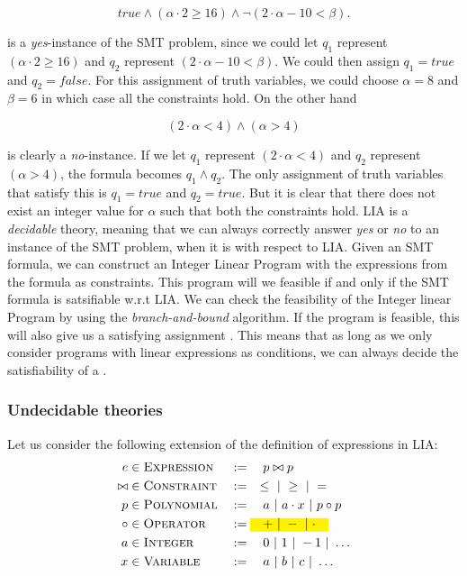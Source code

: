 	\begin{equation*}	
	true \land (\alpha \cdot 2 \geq 16) \land \neg (2\cdot \alpha - 10 < \beta).
	\end{equation*}

	is a \emph{yes}-instance of the SMT problem, since we could let $q_1$ represent $(\alpha \cdot 2 \geq 16)$ and $q_2$ represent $(2\cdot \alpha - 10 < \beta)$. We could then assign $q_1 = true$ and $q_2 = false$. For this assignment of truth variables, we could choose $\alpha = 8$ and $\beta = 6$ in which case all the constraints hold. On the other hand 
	
	\begin{equation*}
		(2\cdot \alpha < 4) \land (\alpha > 4)
	\end{equation*}
	
	is clearly a \emph{no}-instance. If we let $q_1$ represent $(2\cdot \alpha < 4)$ and $q_2$ represent $(\alpha > 4)$, the formula becomes $q_1\land q_2$. The only assignment of truth variables that satisfy this is $q_1 = true$ and $q_2 = true$. But it is clear that there does not exist an integer value for $\alpha$ such that both the constraints hold. LIA is a \emph{decidable} theory, meaning that we can always correctly answer \emph{yes} or \emph{no} to an instance of the SMT problem, when it is with respect to LIA. Given an SMT formula, we can construct an Integer Linear Program with the expressions from the formula as constraints. This program will we feasible if and only if the SMT formula is satsifiable w.r.t LIA. We can check the feasibility of the Integer linear Program by using the \emph{branch-and-bound} algorithm. If the program is feasible, this will also give us a satisfying assignment \citep{Vanderbei01linearprogramming:}. This means that as long as we only consider programs with linear expressions as conditions, we can always decide the satisfiability of a \pc.
	
	\subsubsection{Undecidable theories}
	Let us consider the following extension of the definition of expressions in LIA:
	\begin{alignat*}{3}
		e & \in \textsc{Expression} && := \quad p \bowtie p\\
		\bowtie & \in \textsc{Constraint} && := \quad \leq \alt \geq \alt =\\
		p & \in \textsc{Polynomial} && := \quad a \alt a\cdot x \alt p \circ p\\
		\circ & \in \textsc{Operator} && := \text{\hl{$\quad + \alt - \alt \cdot \quad$}} \\
		a & \in \textsc{Integer} && := \quad 0 \alt 1 \alt -1 \alt \ldots\\ 
		x & \in \textsc{Variable} && := \quad a \alt b \alt c \alt \ldots
	\end{alignat*}
	
